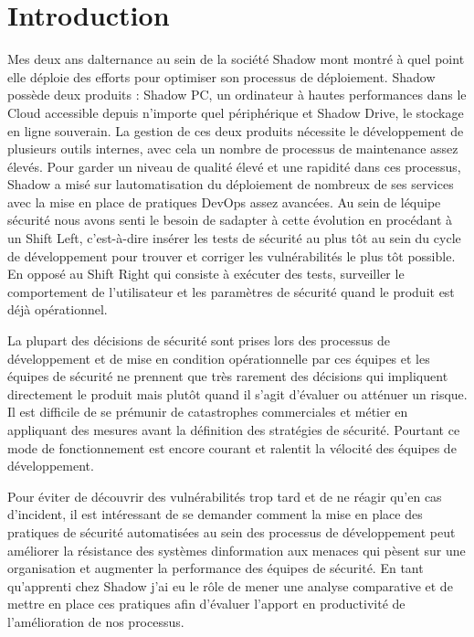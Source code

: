 \documentclass[
  11pt,
  a4paper,
  krantz2,
  11pt,
  oneside]{krantz}
\begin{document}
\chapter{Introduction}\label{introduction}

Mes deux ans d\textquotesingle alternance au sein de la société Shadow m\textquotesingle ont montré à quel point elle déploie des efforts pour optimiser son processus de déploiement. Shadow possède deux produits : Shadow PC, un ordinateur à hautes performances dans le Cloud accessible depuis n'importe quel périphérique et Shadow Drive, le stockage en ligne souverain. La gestion de ces deux produits nécessite le développement de plusieurs outils internes, avec cela un nombre de processus de maintenance assez élevés. Pour garder un niveau de qualité élevé et une rapidité dans ces processus, Shadow a misé sur l\textquotesingle automatisation du déploiement de nombreux de ses services avec la mise en place de pratiques DevOps assez avancées. Au sein de l\textquotesingle équipe sécurité nous avons senti le besoin de s\textquotesingle adapter à cette évolution en procédant à un Shift Left, c'est-à-dire insérer les tests de sécurité au plus tôt au sein du cycle de développement pour trouver et corriger les vulnérabilités le plus tôt possible. En opposé au Shift Right qui consiste à exécuter des tests, surveiller le comportement de l'utilisateur et les paramètres de sécurité quand le produit est déjà opérationnel.

La plupart des décisions de sécurité sont prises lors des processus de développement et de mise en condition opérationnelle par ces équipes et les équipes de sécurité ne prennent que très rarement des décisions qui impliquent directement le produit mais plutôt quand il s'agit d'évaluer ou atténuer un risque. Il est difficile de se prémunir de catastrophes commerciales et métier en appliquant des mesures avant la définition des stratégies de sécurité. Pourtant ce mode de fonctionnement est encore courant et ralentit la vélocité des équipes de développement.

Pour éviter de découvrir des vulnérabilités trop tard et de ne réagir qu'en cas d'incident, il est intéressant de se demander comment la mise en place des pratiques de sécurité automatisées au sein des processus de développement peut améliorer la résistance des systèmes d\textquotesingle information aux menaces qui pèsent sur une organisation et augmenter la performance des équipes de sécurité. En tant qu'apprenti chez Shadow j'ai eu le rôle de mener une analyse comparative et de mettre en place ces pratiques afin d'évaluer l'apport en productivité de l'amélioration de nos processus.
\end{document}
